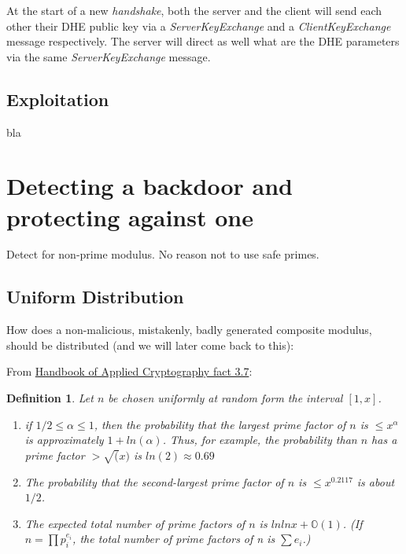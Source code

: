 \documentclass[a4paper,11pt,twocolumn]{article}
\newtheorem{definition}{Definition}
\begin{document}
At the start of a new \emph{handshake}, both the server and the client will send each other their DHE public key via a \emph{ServerKeyExchange} and a \emph{ClientKeyExchange} message respectively. The server will direct as well what are the DHE parameters via the same \emph{ServerKeyExchange} message.

\subsection{Exploitation}

bla


\section{Detecting a backdoor and protecting against one}

Detect for non-prime modulus. No reason not to use safe primes.

\subsection{Uniform Distribution}

How does a non-malicious, mistakenly, badly generated composite modulus, should be distributed (and we will later come back to this):

From \href{http://cacr.uwaterloo.ca/hac/about/chap3.pdf}{Handbook of Applied Cryptography fact 3.7}:

\begin{definition}
    Let $n$ be chosen uniformly at random form the interval $[1, x]$.
    \begin{enumerate}
        \item if $1/2 \leq \alpha \leq 1$, then the probability that the largest prime factor of $n$ is $\leq x^{\alpha}$ is approximately $1+ ln(\alpha)$. Thus, for example, the probability than $n$ has a prime factor $> \sqrt(x)$ is $ln(2) \approx 0.69$
        \item The probability that the second-largest prime factor of $n$ is $\leq x^{0.2117}$ is about $1/2$. 
        \item The expected total number of prime factors of $n$ is $ln ln x + \mathbb{O}(1)$. (If $n = \prod p_i^{e_i}$, the total number of prime factors of n is $\sum e_i$.)
    \end{enumerate} 
\end{definition}
\end{document}
